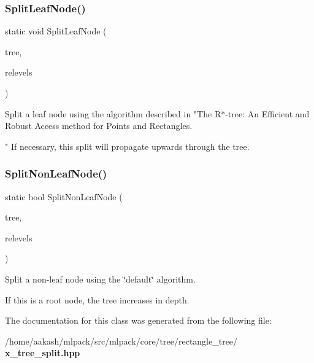 \subsubsection{Split\+Leaf\+Node()}
{\footnotesize\ttfamily static void Split\+Leaf\+Node (\begin{DoxyParamCaption}\item[{Tree\+Type $\ast$}]{tree,  }\item[{std\+::vector$<$ bool $>$ \&}]{relevels }\end{DoxyParamCaption})\hspace{0.3cm}{\ttfamily [static]}}



Split a leaf node using the algorithm described in "The R$\ast$-\/tree\+: An Efficient and Robust Access method for Points and Rectangles. 

" If necessary, this split will propagate upwards through the tree. \mbox{\label{classmlpack_1_1tree_1_1XTreeSplit_a73ff1eaa94449d763847fff1f537922f}} 
\subsubsection{Split\+Non\+Leaf\+Node()}
{\footnotesize\ttfamily static bool Split\+Non\+Leaf\+Node (\begin{DoxyParamCaption}\item[{Tree\+Type $\ast$}]{tree,  }\item[{std\+::vector$<$ bool $>$ \&}]{relevels }\end{DoxyParamCaption})\hspace{0.3cm}{\ttfamily [static]}}



Split a non-\/leaf node using the \char`\"{}default\char`\"{} algorithm. 

If this is a root node, the tree increases in depth. 

The documentation for this class was generated from the following file\+:\begin{DoxyCompactItemize}
\item 
/home/aakash/mlpack/src/mlpack/core/tree/rectangle\+\_\+tree/\textbf{ x\+\_\+tree\+\_\+split.\+hpp}\end{DoxyCompactItemize}
